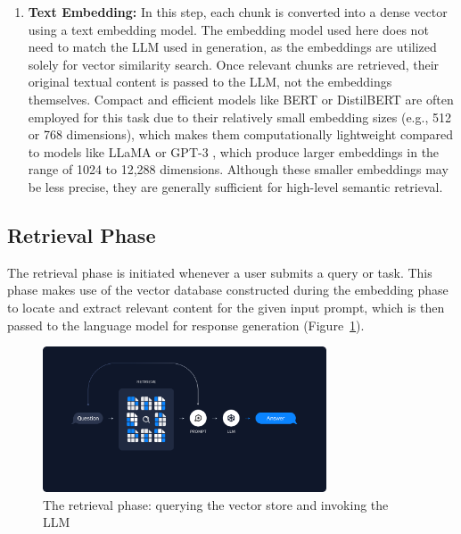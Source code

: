 \begin{enumerate}[label=\alph*.]
  \item \textbf{Text Embedding:} In this step, each chunk is converted into a dense vector using a text embedding model. The embedding model used here does not need to match the LLM used in generation, as the embeddings are utilized solely for vector similarity search. Once relevant chunks are retrieved, their original textual content is passed to the LLM, not the embeddings themselves. Compact and efficient models like BERT or DistilBERT are often employed for this task due to their relatively small embedding sizes (e.g., 512 or 768 dimensions), which makes them computationally lightweight compared to models like LLaMA \cite{touvron2023llama} or GPT-3 \cite{brown2020language}, which produce larger embeddings in the range of 1024 to 12,288 dimensions. Although these smaller embeddings may be less precise, they are generally sufficient for high-level semantic retrieval.
\end{enumerate}

\subsection{Retrieval Phase}
\label{subsec:RetrievalPhase}

The retrieval phase is initiated whenever a user submits a query or task. This phase makes use of the vector database constructed during the embedding phase to locate and extract relevant content for the given input prompt, which is then passed to the language model for response generation (Figure~\ref{fig:retrieval_phase}).



\begin{figure}[h]
    \centering
    \includegraphics[width=0.75\textwidth]{images/lagchain-rag-retrieval.png}
    \caption{The retrieval phase: querying the vector store and invoking the LLM~\cite{langchain_rag}}
    \label{fig:retrieval_phase}
\end{figure}

